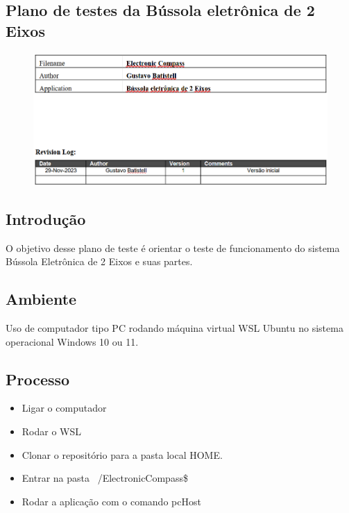 \documentclass[10pt,twocolumn,letterpaper]{article}
\begin{document}
\onecolumn
{}
\label{apendice-b}

\subsection*{Plano de testes da Bússola eletrônica de 2 Eixos}
\begin{figure}[h]
  \centering
  \includegraphics[keepaspectratio=true,scale=0.44]{figures/PlanoTestes.png}
  \label{fig:diagrama-classes}
\end{figure}

\subsection*{Introdução}
O objetivo desse plano de teste é orientar o teste de funcionamento do sistema Bússola Eletrônica	de 2 Eixos e suas partes.
\subsection*{Ambiente}
Uso de computador tipo PC rodando máquina virtual WSL Ubuntu no sistema operacional Windows 10 ou 11.
\subsection*{Processo}
\begin{itemize}
  \item Ligar o computador
  \item Rodar o WSL
  \item Clonar o repositório \cite{src-github} para a pasta local HOME.
  \item Entrar na pasta ~/ElectronicCompass\$ 
  \item Rodar a aplicação com o comando pcHost
\end{itemize}
\end{document}
